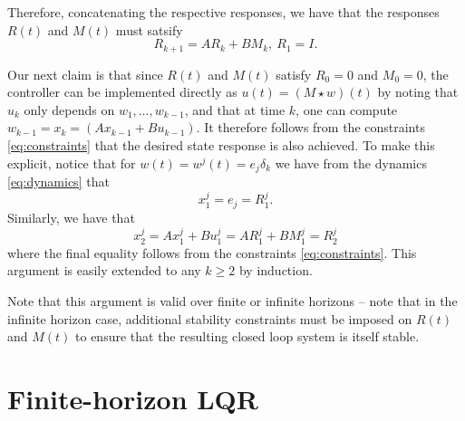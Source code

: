 \documentclass[11pt]{article}
\numberwithin{equation}{section}
\begin{document}
Therefore, concatenating the respective responses, we have that the responses $R(t)$ and $M(t)$ must satsify
\begin{equation}
R_{k+1} = AR_k + BM_k, \ R_1 = I.
\label{eq:constraints}
\end{equation}

Our next claim is that since $R(t)$ and $M(t)$ satisfy $R_0 = 0$ and $M_0=0$, the controller can be implemented directly as $u(t) = (M\star w)(t)$ by noting that $u_k$ only depends on $w_1,\dots,w_{k-1}$, and that at time $k$, one can compute $w_{k-1} = x_k = (Ax_{k-1} + Bu_{k-1})$.  It therefore follows from the constraints \eqref{eq:constraints} that the desired state response is also achieved.  To make this explicit, notice that for $w(t) = w^j(t) = e_j \delta_k$ we have from the dynamics \eqref{eq:dynamics} that
\[
x^j_1 = e_j = R^j_1.
\]
Similarly, we have that
\[
x^j_2 = Ax^j_1 + Bu^j_1 = AR^j_1 + BM^j_1 = R^j_2
\]
where the final equality follows from the constraints \eqref{eq:constraints}.  This argument is easily extended to any $k\geq 2$ by induction.

Note that this argument is valid over finite or infinite horizons -- note that in the infinite horizon case, additional stability constraints must be imposed on $R(t)$ and $M(t)$ to ensure that the resulting closed loop system is itself stable.

\section{Finite-horizon LQR}
\end{document}
